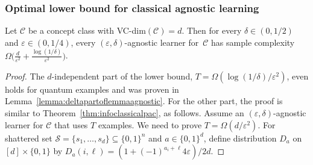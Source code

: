 \documentclass[twoside,11pt]{article}
\newcommand{\eps}{\varepsilon}
\newcommand{\Sh}{\ensuremath{\mathcal{S}}}
\def\01{\{0,1\}}
\newcommand{\C}{\ensuremath{\mathscr{C}}}
\begin{document}
\subsubsection{Optimal lower bound for classical agnostic learning}

\begin{theorem}\label{thm:infoclassicalagn}
	Let $\C$ be a concept class with VC-dim$(\C)=d$. Then for every $\delta\in (0,1/2)$ and $\eps \in (0,1/4)$, every $(\eps,\delta)$-agnostic learner for~$\C$ has sample complexity 
	$\Omega\Big(\frac{d}{\eps^2} + \frac{\log(1/\delta)}{\eps^2}\Big)$.
\end{theorem}

\begin{proof}
	The $d$-independent part of the lower bound, $T=\Omega(\log(1/\delta)/\eps^2)$, even holds for quantum examples and was proven in Lemma~\ref{lemma:deltapartoflemmaagnostic}. For the other part, the proof is similar to Theorem~\ref{thm:infoclassicalpac}, as follows.
	Assume an $(\eps,\delta)$-agnostic learner for $\C$ that uses $T$ examples.
	We need to prove $T=\Omega(d/\eps^2)$.
	For shattered set $\Sh=\{s_1,\ldots,s_d\} \subseteq \01^n$ and $a\in\01^d$, define distribution $D_a$ on $[d]\times\01$ by $D_a(i,\ell)=(1+(-1)^{a_i+\ell}4\eps)/2d$. 
	

\end{proof}
\end{document}
